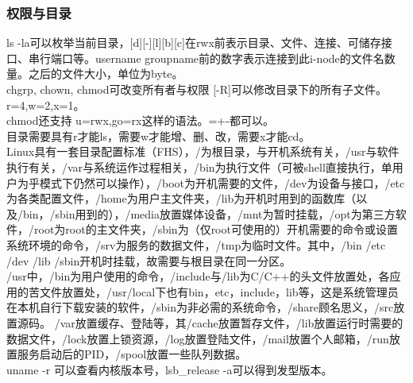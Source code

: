 \documentclass{ctexart}
\begin{document}
\subsubsection*{权限与目录}
\noindent ls -la可以枚举当前目录，[d][-][l][b][c]在rwx前表示目录、文件、连接、可储存接口、串行端口等。username groupname前的数字表示连接到此i-node的文件名数量。之后的文件大小，单位为byte。\\
\noindent chgrp, chown, chmod可改变所有者与权限 [-R]可以修改目录下的所有子文件。r=4,w=2,x=1。\\
\noindent chmod还支持 u=rwx,go=rx这样的语法。=+-都可以。\\
\noindent 目录需要具有r才能ls，需要w才能增、删、改，需要x才能cd。\\
\noindent Linux具有一套目录配置标准（FHS），/为根目录，与开机系统有关，/usr与软件执行有关，/var与系统运作过程相关，/bin为执行文件（可被shell直接执行，单用户为乎模式下仍然可以操作），/boot为开机需要的文件，/dev为设备与接口，/etc为各类配置文件，/home为用户主文件夹，/lib为开机时用到的函数库（以及/bin，/sbin用到的），/media放置媒体设备，/mnt为暂时挂载，/opt为第三方软件，/root为root的主文件夹，/sbin为（仅root可使用的）开机需要的命令或设置系统环境的命令，/srv为服务的数据文件，/tmp为临时文件。其中，/bin /etc /dev /lib /sbin开机时挂载，故需要与根目录在同一分区。\\
\noindent /usr中，/bin为用户使用的命令，/include与/lib为C/C++的头文件放置处，各应用的苦文件放置处，/usr/local下也有bin，etc，include，lib等，这是系统管理员在本机自行下载安装的软件，/sbin为非必需的系统命令，/share顾名思义，/src放置源码。
\noindent /var放置缓存、登陆等，其/cache放置暂存文件，/lib放置运行时需要的数据文件，/lock放置上锁资源，/log放置登陆文件，/mail放置个人邮箱，/run放置服务启动后的PID，/spool放置一些队列数据。\\
\noindent uname -r 可以查看内核版本号，lsb\_release -a可以得到发型版本。
\end{document}
